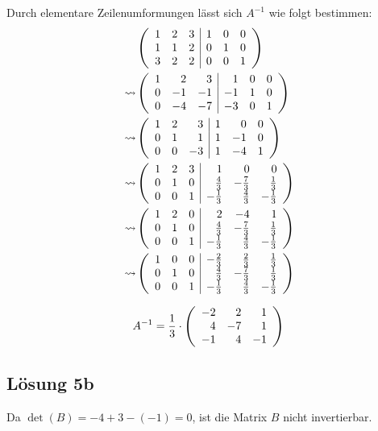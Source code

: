 \documentclass[main.tex]{subfiles}
\begin{document}
Durch elementare Zeilenumformungen lässt sich $A^{-1}$ wie folgt bestimmen:
\begin{equation*}
    \begin{aligned}
        & \eqmatrix{rrr|rrr}{
            1 & 2 & 3 & 1 & 0 & 0\\
            1 & 1 & 2 & 0 & 1 & 0\\
            3 & 2 & 2 & 0 & 0 & 1\\
        }\\
        \leadsto  & \eqmatrix{rrr|rrr}{
            1 &  2 &  3 &  1 & 0 & 0\\
            0 & -1 & -1 & -1 & 1 & 0\\
            0 & -4 & -7 & -3 & 0 & 1\\
        }\\
        \leadsto  & \eqmatrix{rrr|rrr}{
            1 &  2 &  3 &  1 &  0 & 0\\
            0 &  1 &  1 &  1 & -1 & 0\\
            0 &  0 & -3 &  1 & -4 & 1\\
        }\\
        \leadsto  & \eqmatrix{rrr|rrr}{
            1 &  2 &  3 &     1 &   0 &    0 \\
            0 &  1 &  0 &  \frac{4}{3}  & -\frac{7}{3} & \frac{1}{3} \\
            0 &  0 &  1 &  -\frac{1}{3} & \frac{4}{3}  & -\frac{1}{3} \\
        }\\
        \leadsto  & \eqmatrix{rrr|rrr}{
            1 &  2 &  0 &             2 &           -4 &           1 \\
            0 &  1 &  0 &  \frac{4}{3}  & -\frac{7}{3} & \frac{1}{3} \\
            0 &  0 &  1 &  -\frac{1}{3} & \frac{4}{3}  & -\frac{1}{3} \\
        }\\
        \leadsto  & \eqmatrix{rrr|rrr}{
            1 &  0 &  0 &  -\frac{2}{3} & \frac{2}{3}  &  \frac{1}{3} \\
            0 &  1 &  0 &  \frac{4}{3}  & -\frac{7}{3} & \frac{1}{3} \\
            0 &  0 &  1 &  -\frac{1}{3} & \frac{4}{3}  & -\frac{1}{3} \\
        }\\
    \end{aligned}
\end{equation*}

\begin{equation*}
    A^{-1} = \frac{1}{3} \cdot \eqmatrix{rrr}{
        -2 &  2 &  1 \\
         4 & -7 &  1 \\
        -1 &  4 & -1 \\
    }\\
\end{equation*}
\subsection{Lösung 5b}
Da $\det (B) = -4 + 3 - (-1) = 0$, ist die Matrix $B$ nicht invertierbar.
\end{document}
